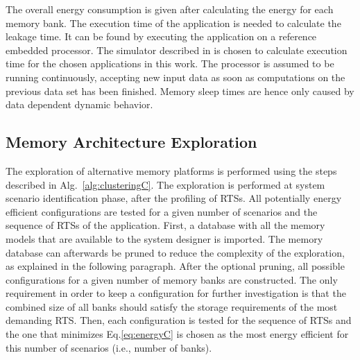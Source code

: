 \setlength{\arraycolsep}{5pt}
The overall energy consumption is given after calculating the energy for each memory bank. 
The execution time of the application is needed to calculate the leakage time. 
It can be found by executing the application on a reference embedded processor. 
The simulator described in \cite{Gem5} is chosen to calculate execution time for the chosen applications in this work. 
The processor is assumed to be running continuously, accepting new input data as soon as computations on the previous data set has been finished. 
Memory sleep times are hence only caused by data dependent dynamic behavior.

\subsection{Memory Architecture Exploration}

The exploration of alternative memory platforms is performed using the steps described in Alg.~\ref{alg:clusteringC}. 
The exploration is performed at system scenario identification phase, after the profiling of RTSs.
All potentially energy efficient configurations are tested for a given number of scenarios and the sequence of RTSs of the application.
First, a database with all the memory models that are available to the system designer is imported.
The memory database can afterwards be pruned to reduce the complexity of the exploration, as explained in the following paragraph. 
After the optional pruning, all possible configurations for a given number of memory banks are constructed. 
The only requirement in order to keep a configuration for further investigation is that the combined size of all banks should satisfy the storage requirements of the most demanding RTS. 
Then, each configuration is tested for the sequence of RTSs and the one that minimizes Eq.\ref{eq:energyC} is chosen as the most energy efficient for this number of scenarios (i.e., number of banks). 

